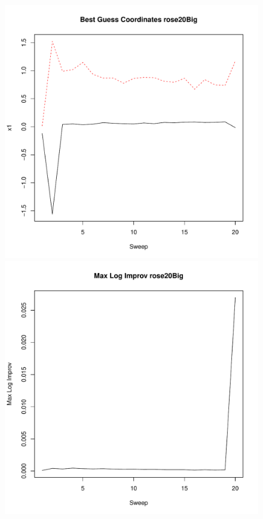 \documentclass{article}
\begin{document}
\clearpage

\begin{figure}
	\begin{center}
		\begin{minipage}[h!]{0.49\textwidth}
			\includegraphics[width=1.0\textwidth]{rose20BigCoord.pdf}
		\end{minipage}
		\begin{minipage}[h!]{0.49\textwidth}
			\includegraphics[width=1.0\textwidth]{rose20BigMLI.pdf}	
		\end{minipage}
	\end{center}
\end{figure}
\end{document}

